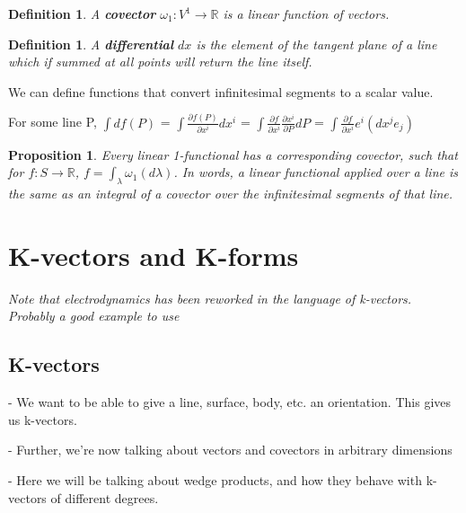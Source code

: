 \documentclass{book}
\newtheorem{defn}[equation]{Definition}
\newtheorem{prop}[equation]{Proposition}
\begin{document}
\begin{defn}
	A \textbf{covector} $\omega_1 : V^1 \to \mathbb{R}$ is a linear function of vectors. 
\end{defn}



\begin{defn}
	A \textbf{differential} $dx$ is the element of the tangent plane of a line which if summed at all points will return the line itself. 
\end{defn}

We can define functions that convert infinitesimal segments to a scalar value. 

For some line P, $\int df(P)$ = $\int \frac{\partial f(P)}{{\partial x^i}} dx^i$ = $\int \frac{\partial f}{\partial x^i}\frac{\partial x^i}{\partial P}dP$ = $\int \frac{{\partial f}}{{\partial x^i}} e^i (dx^j e_j)$






\begin{prop}
	Every linear 1-functional has a corresponding covector, such that for $f : S \to \mathbb{R}$, $f = \int_{\lambda} \omega_1(d\lambda)$. In words, a linear functional applied over a line is the same as an integral of a covector over the infinitesimal segments of that line. 
\end{prop}





\section{K-vectors and K-forms}

\emph{Note that electrodynamics has been reworked in the language of k-vectors. Probably a good example to use}




\subsection{K-vectors}

- We want to be able to give a line, surface, body, etc. an orientation. This gives us k-vectors.

- Further, we're now talking about vectors and covectors in arbitrary dimensions

- Here we will be talking about wedge products, and how they behave with k-vectors of different degrees. 
\end{document}
